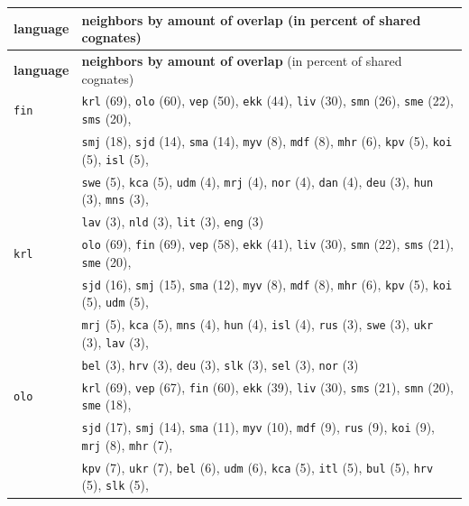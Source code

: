 \begin{center}
\small
\begin{longtable}{ll}
\hline\hline
\textbf{language} & \textbf{neighbors by amount of overlap} (in percent of shared cognates)\\
\hline
\endfirsthead
\hline\hline
\textbf{language} & \textbf{neighbors by amount of overlap} (in percent of shared cognates)\\
\hline
\endhead
\hline
\endfoot
\hline
\endlastfoot

\texttt{fin} & \texttt{krl} (69), \texttt{olo} (60), \texttt{vep} (50), \texttt{ekk} (44), \texttt{liv} (30), \texttt{smn} (26), \texttt{sme} (22), \texttt{sms} (20),\\
 & \texttt{smj} (18), \texttt{sjd} (14), \texttt{sma} (14), \texttt{myv} (8), \texttt{mdf} (8), \texttt{mhr} (6), \texttt{kpv} (5), \texttt{koi} (5), \texttt{isl} (5),\\
 & \texttt{swe} (5), \texttt{kca} (5), \texttt{udm} (4), \texttt{mrj} (4), \texttt{nor} (4), \texttt{dan} (4), \texttt{deu} (3), \texttt{hun} (3), \texttt{mns} (3),\\
 & \texttt{lav} (3), \texttt{nld} (3), \texttt{lit} (3), \texttt{eng} (3) \\
\texttt{krl} & \texttt{olo} (69), \texttt{fin} (69), \texttt{vep} (58), \texttt{ekk} (41), \texttt{liv} (30), \texttt{smn} (22), \texttt{sms} (21), \texttt{sme} (20),\\
 & \texttt{sjd} (16), \texttt{smj} (15), \texttt{sma} (12), \texttt{myv} (8), \texttt{mdf} (8), \texttt{mhr} (6), \texttt{kpv} (5), \texttt{koi} (5), \texttt{udm} (5),\\
 & \texttt{mrj} (5), \texttt{kca} (5), \texttt{mns} (4), \texttt{hun} (4), \texttt{isl} (4), \texttt{rus} (3), \texttt{swe} (3), \texttt{ukr} (3), \texttt{lav} (3),\\
 & \texttt{bel} (3), \texttt{hrv} (3), \texttt{deu} (3), \texttt{slk} (3), \texttt{sel} (3), \texttt{nor} (3) \\
\texttt{olo} & \texttt{krl} (69), \texttt{vep} (67), \texttt{fin} (60), \texttt{ekk} (39), \texttt{liv} (30), \texttt{sms} (21), \texttt{smn} (20), \texttt{sme} (18),\\
 & \texttt{sjd} (17), \texttt{smj} (14), \texttt{sma} (11), \texttt{myv} (10), \texttt{mdf} (9), \texttt{rus} (9), \texttt{koi} (9), \texttt{mrj} (8), \texttt{mhr} (7),\\
 & \texttt{kpv} (7), \texttt{ukr} (7), \texttt{bel} (6), \texttt{udm} (6), \texttt{kca} (5), \texttt{itl} (5), \texttt{bul} (5), \texttt{hrv} (5), \texttt{slk} (5),\\

\end{longtable}
\end{center}
